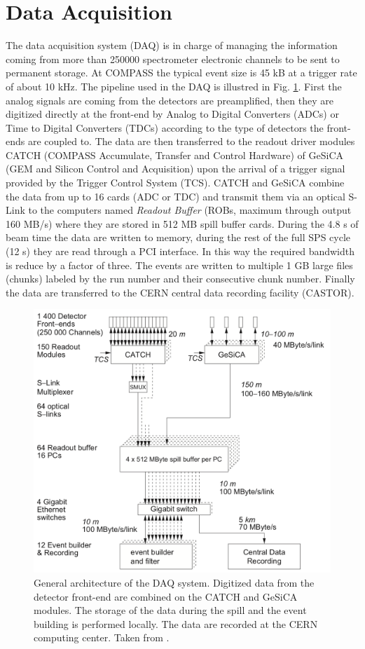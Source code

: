 \section{Data Acquisition}

The data acquisition system (DAQ) \cite{} is in charge of managing the information coming from more than 250000 spectrometer electronic channels to be sent to permanent storage.
At COMPASS the typical event size is 45 kB at a trigger rate of about 10 kHz. The pipeline used in the DAQ is illustred in Fig. \ref{pic:DAQ}. First the analog signals are coming from
the detectors are preamplified, then they are digitized directly at the front-end by Analog to Digital Converters (ADCs) or Time to Digital Converters (TDCs) according to the type
of detectors the front-ends are coupled to. The data are then transferred to the readout driver modules CATCH (COMPASS Accumulate, Transfer and Control Hardware) of GeSiCA (GEM and
Silicon Control and Acquisition) upon the arrival of a trigger signal provided by the Trigger Control System (TCS). CATCH and GeSiCA combine the data from up to 16 cards (ADC or TDC)
and transmit them via an optical S-Link to the computers named \textit{Readout Buffer} (ROBs, maximum through output 160 MB/s) where they are stored in 512 MB spill buffer cards.
During the 4.8 s of beam time the data are written to memory, during the rest of the full SPS cycle (12 s) they are read through a PCI interface. In this way the required bandwidth
is reduce by a factor of three. The events are written to multiple 1 GB large files (chunks) labeled by the run number and their consecutive chunk number. Finally the data are transferred
to the CERN central data recording facility (CASTOR).

\begin{figure}[!h]
  \centering
	\includegraphics[scale=0.4]{./gfx/DAQ.png}
	\caption{General architecture of the DAQ system. Digitized data from the detector front-end are combined on the CATCH and GeSiCA modules. The storage of the data during the spill and the event building is performed locally. The data are recorded at the CERN computing center. Taken from \cite{NIM}.}
	\label{pic:DAQ}
\end{figure}

